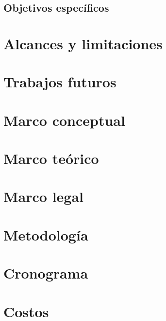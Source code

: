 \documentclass[letter,12pt]{book}
\begin{document}
  \section{Objetivos específicos}
   

  \chapter{Alcances y limitaciones}
  \label{chap:alcances_limitaciones}
  
  
  \chapter{Trabajos futuros}
  

  \chapter{Marco conceptual}
  
 
  \chapter{Marco teórico}
  
  
  \chapter{Marco legal}
  
  
  \chapter{Metodología}
  
  
  \chapter{Cronograma}
  
  
  \chapter{Costos}
  \label{chap:costos}
  
  
  
  
  
  
\end{document}
